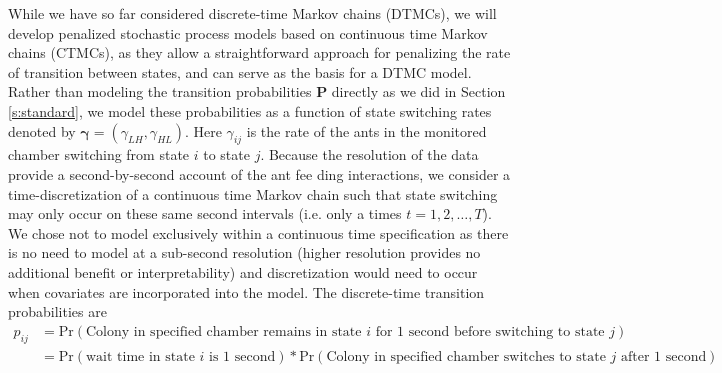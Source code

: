 \documentclass[cmbright,fleqn,referee]{envauth}
\begin{document}
While we have so far considered discrete-time Markov chains (DTMCs), we will develop penalized stochastic process models based on continuous time Markov chains (CTMCs), as they allow a straightforward approach for penalizing the rate of transition between states, and can serve as the basis for a DTMC model. Rather than modeling the transition probabilities $\mathbf{P}$ directly as we did in Section \ref{s:standard}, we model these probabilities as a function of state switching rates denoted by $\bm{\gamma} = (\gamma_{LH}, \gamma_{HL})$. Here $\gamma_{ij}$ is the rate of the ants in the monitored chamber switching from state $i$ to state $j$. Because the resolution of the data provide a second-by-second account of the ant fee	ding interactions, we consider a time-discretization of a continuous time Markov chain such that state switching may only occur on these same second intervals (i.e. only a times $t = 1, 2, \dots, T$). We chose not to model exclusively within a continuous time specification as there is no need to model at a sub-second resolution (higher resolution provides no additional benefit or interpretability) and discretization would need to occur when covariates are incorporated into the model. The discrete-time transition probabilities are
\begin{equation}
\begin{aligned}
p_{ij} &=  \text{Pr}(
\text{Colony in specified chamber remains in state $i$ for 1 second before switching to state $j$})\\
    &= \text{Pr}(\text{wait time in state $i$ is 1 second}) * \text{Pr}(\text{Colony in specified chamber switches to state $j$ after 1 second})\\
\end{aligned}
\label{e:pij}
\end{equation}
\end{document}
